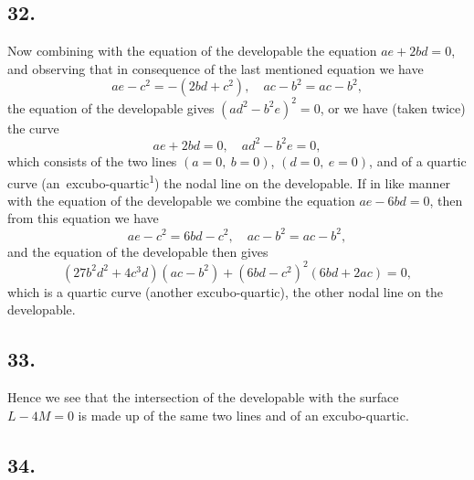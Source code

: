 \documentclass[11pt,a4paper]{article}
\theoremstyle{definition}
\begin{document}
\subsection*{32.}

Now combining with the equation of the developable the equation $ae + 2bd = 0$,
and observing that in consequence of the last mentioned equation we have
\[
ae - c^{2} = -(2bd + c^{2}),\quad ac - b^{2} = ac - b^{2},
\]
the equation of the developable gives $(ad^{2} - b^{2}e)^{2} = 0$, or we have (taken twice) the curve
\[
ae + 2bd = 0,\quad ad^{2} - b^{2}e = 0,
\]
which consists of the two lines $(a = 0,\ b = 0)$, $(d = 0,\ e = 0)$, and of a quartic curve (an\ excubo-quartic\textsuperscript{1}) the nodal line on the developable. If in like manner with the equation of the developable we combine the equation $ae - 6bd = 0$, then from this equation we have
\[
ae - c^{2} = 6bd - c^{2},\quad ac - b^{2} = ac - b^{2},
\]
and the equation of the developable then gives
\[
(27b^{2}d^{2} + 4c^{3}d)(ac - b^{2}) + (6bd - c^{2})^{2}(6bd + 2ac) = 0,
\]
which is a quartic curve (another excubo-quartic), the other nodal line on the developable.


\subsection*{33.}

Hence we see that the intersection of the developable with the surface $L - 4M = 0$
is made up of the same two lines and of an excubo-quartic.

\subsection*{34.}
\end{document}
